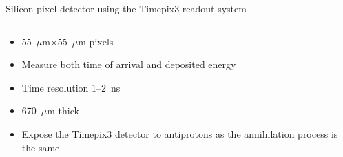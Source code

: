 \documentclass{beamer}
\begin{document}
\begin{frame}{\centering Silicon pixel detector using the Timepix3 readout system}
  \begin{columns}
    \begin{column}{0.5\textwidth}
      \begin{itemize}
      \item{55~$\mu$m$\times$55~$\mu$m pixels}
      \item{Measure both time of arrival and deposited energy}
      \item{Time resolution 1--2~ns}
      \item{670~$\mu$m thick}
      \item{Expose the Timepix3 detector to antiprotons as the annihilation process is the same}
      \end{itemize}
     \end{column}
    \begin{column}{0.5\textwidth}
    \end{column}
  \end{columns}
 \end{frame}
\end{document}

